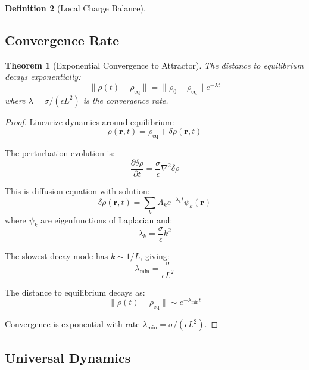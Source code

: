 \documentclass[12pt,a4paper]{article}
\theoremstyle{plain}
\newtheorem{theorem}{Theorem}[section]
\theoremstyle{definition}
\newtheorem{definition}[theorem]{Definition}
\theoremstyle{remark}
\begin{document}
\begin{definition}[Local Charge Balance]
\subsection{Convergence Rate}

\begin{theorem}[Exponential Convergence to Attractor]
\label{thm:exponential_convergence}
The distance to equilibrium decays exponentially:
\begin{equation}
\|\rho(t) - \rho_{\text{eq}}\| = \|\rho_0 - \rho_{\text{eq}}\| e^{-\lambda t}
\end{equation}
where $\lambda = \sigma / (\epsilon L^2)$ is the convergence rate.
\end{theorem}

\begin{proof}
Linearize dynamics around equilibrium:
\begin{equation}
\rho(\mathbf{r}, t) = \rho_{\text{eq}} + \delta \rho(\mathbf{r}, t)
\end{equation}

The perturbation evolution is:
\begin{equation}
\frac{\partial \delta \rho}{\partial t} = \frac{\sigma}{\epsilon} \nabla^2 \delta \rho
\end{equation}

This is diffusion equation with solution:
\begin{equation}
\delta \rho(\mathbf{r}, t) = \sum_k A_k e^{-\lambda_k t} \psi_k(\mathbf{r})
\end{equation}
where $\psi_k$ are eigenfunctions of Laplacian and:
\begin{equation}
\lambda_k = \frac{\sigma}{\epsilon} k^2
\end{equation}

The slowest decay mode has $k \sim 1/L$, giving:
\begin{equation}
\lambda_{\min} = \frac{\sigma}{\epsilon L^2}
\end{equation}

The distance to equilibrium decays as:
\begin{equation}
\|\rho(t) - \rho_{\text{eq}}\| \sim e^{-\lambda_{\min} t}
\end{equation}

Convergence is exponential with rate $\lambda_{\min} = \sigma / (\epsilon L^2)$.
\end{proof}

\subsection{Universal Dynamics}


\end{definition}
\end{document}
